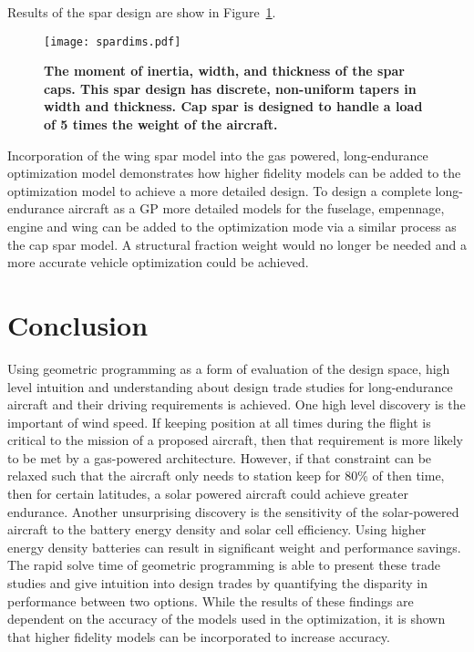 \documentclass[]{aiaa-tc}%
\begin{document}
Results of the spar design are show in Figure~\ref{f:spardims}.

\begin{figure}[h!]
	\begin{center}
	\texttt{[image: spardims.pdf]}
    \caption{ \textbf{ The moment of inertia, width, and thickness of the spar caps. This spar design has discrete, non-uniform tapers in width and thickness.  Cap spar is designed to handle a load of 5 times the weight of the aircraft.}}
	\label{f:spardims}
	\end{center}
\end{figure}
 


Incorporation of the wing spar model into the gas powered, long-endurance optimization model demonstrates how higher fidelity models can be added to the optimization model to achieve a more detailed design.  
To design a complete long-endurance aircraft as a GP more detailed models for the fuselage, empennage, engine and wing can be added to the optimization mode via a similar process as the cap spar model. A structural fraction weight would no longer be needed and a more accurate vehicle optimization could be achieved.
 
\section{Conclusion}

Using geometric programming as a form of evaluation of the design space, high level intuition and understanding about design trade studies for long-endurance aircraft and their driving requirements is achieved.  
One high level discovery is the important of wind speed.  
If keeping position at all times during the flight is critical to the mission of a proposed aircraft, then that requirement is more likely to be met by a gas-powered architecture.
However, if that constraint can be relaxed such that the aircraft only needs to station keep for 80\% of then time, then for certain latitudes, a solar powered aircraft could achieve greater endurance.
Another unsurprising discovery is the sensitivity of the solar-powered aircraft to the battery energy density and solar cell efficiency.  Using higher energy density batteries can result in significant weight and performance savings.  
The rapid solve time of geometric programming is able to present these trade studies and give intuition into design trades by quantifying the disparity in performance between two options.
While the results of these findings are dependent on the accuracy of the models used in the optimization, it is shown that higher fidelity models can be incorporated to increase accuracy.
\end{document}
